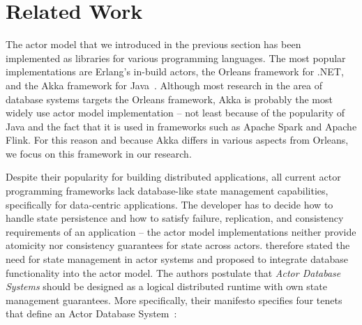 
\section{Related Work}\label{sec:related_work}

  The actor model that we introduced in the previous section has been implemented as libraries for various programming languages. 
  The most popular implementations are Erlang's in-build actors, the Orleans framework for .NET, and the Akka framework for Java~\cite{armstrong:erlang,Haller:2012,akka,akka.net,bernstein:orleans}.
  Although most research in the area of database systems targets the Orleans framework, Akka is probably the most widely use actor model implementation -- not least because of the popularity of Java and the fact that it is used in frameworks such as Apache Spark and Apache Flink.
  For this reason and because Akka differs in various aspects from Orleans, we focus on this framework in our research.
  

  Despite their popularity for building distributed applications, all current actor programming frameworks lack database-like state management capabilities, specifically for data-centric applications.
  The developer has to decide how to handle state persistence and how to satisfy failure, replication, and consistency requirements of an application -- the actor model implementations neither provide atomicity nor consistency guarantees for state across actors.
   therefore stated the need for state management in actor systems and proposed to integrate database functionality into the actor model.
  The authors postulate that \textit{Actor Database Systems} should be designed as a logical distributed runtime with own state management guarantees.
  More specifically, their manifesto specifies four tenets that define an Actor Database System~\cite{manifesto}:

